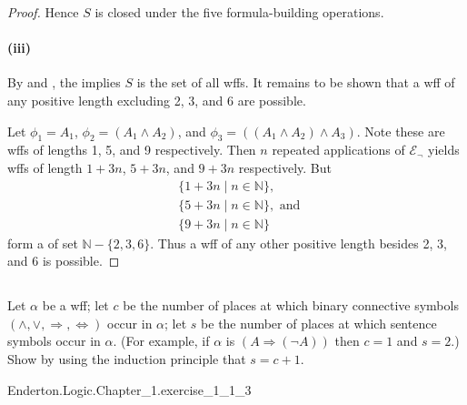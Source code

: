 \documentclass{report}
\begin{document}
\begin{proof}
      Hence $S$ is closed under the five formula-building operations.

    \paragraph{(iii)}%

      By  and , the
         implies $S$ is the set of all wffs.
      It remains to be shown that a wff of any positive length excluding 2, 3,
        and 6 are possible.

      Let $\phi_1 = A_1$, $\phi_2 = (A_1 \land A_2)$, and
        $\phi_3 = ((A_1 \land A_2) \land A_3)$.
      Note these are wffs of lengths 1, 5, and 9 respectively.
      Then $n$ repeated applications of $\mathcal{E}_{\neg}$ yields wffs of
        length $1 + 3n$, $5 + 3n$, and $9 + 3n$ respectively.
      But
        \begin{align*}
          & \{ 1 + 3n \mid n \in \mathbb{N} \}, \\
          & \{ 5 + 3n \mid n \in \mathbb{N} \}, \text{ and } \\
          & \{ 9 + 3n \mid n \in \mathbb{N} \}
        \end{align*}
        form a  of set $\mathbb{N} - \{ 2, 3, 6 \}$.
      Thus a wff of any other positive length besides 2, 3, and 6 is possible.

  \end{proof}

\subsection{}%

  Let $\alpha$ be a wff; let $c$ be the number of places at which binary
    connective symbols $(\land, \lor, \Rightarrow, \Leftrightarrow)$ occur in
    $\alpha$; let $s$ be the number of places at which sentence symbols occur in
    $\alpha$.
  (For example, if $\alpha$ is $(A \Rightarrow (\neg A))$ then $c = 1$ and
    $s = 2$.)
  Show by using the induction principle that $s = c + 1$.

    {Enderton.Logic.Chapter\_1.exercise\_1\_1\_3}
\end{document}
